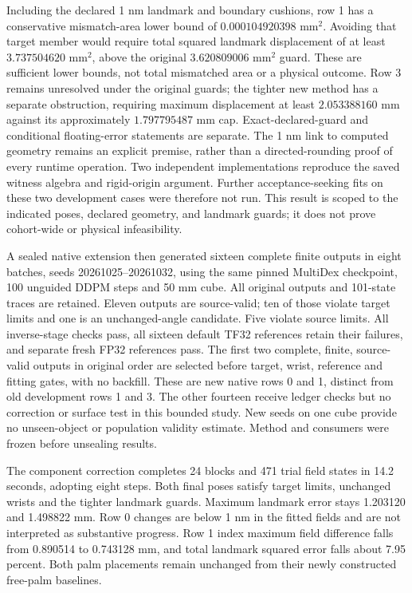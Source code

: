 \documentclass[10pt,letterpaper]{article}
\begin{document}
Including the declared 1 nm landmark and boundary cushions, row 1 has a
conservative mismatch-area lower bound of $0.000104920398$ mm$^2$. Avoiding
that target member would require total squared landmark displacement of at least
$3.737504620$ mm$^2$, above the original $3.620809006$ mm$^2$ guard.
These are sufficient lower bounds, not total mismatched area or a physical
outcome. Row 3 remains unresolved under the original guards; the tighter new
method has a separate obstruction, requiring maximum displacement at least
$2.053388160$ mm against its approximately $1.797795487$ mm cap. Exact-declared-guard and
conditional floating-error statements are separate. The 1 nm link to computed
geometry remains an explicit premise, rather than a directed-rounding proof
of every runtime operation. Two independent implementations reproduce the saved
witness algebra and rigid-origin argument. Further acceptance-seeking fits on
these two development cases were therefore not run. This result is scoped to
the indicated poses, declared geometry, and landmark guards; it does not prove
cohort-wide or physical infeasibility.

A sealed native extension then generated sixteen complete finite outputs in
eight batches, seeds 20261025--20261032, using the same pinned MultiDex
checkpoint, 100 unguided DDPM steps and 50 mm cube. All original outputs and
101-state traces are retained. Eleven outputs are source-valid; ten of those
violate target limits and one is an unchanged-angle candidate. Five violate
source limits. All inverse-stage checks pass, all sixteen default TF32
references retain their failures, and separate fresh FP32 references pass.
The first two complete, finite, source-valid outputs in original order are
selected before target, wrist, reference and fitting gates, with no backfill.
These are new native rows 0 and 1, distinct from old development rows 1 and 3.
The other fourteen receive ledger checks but no correction or surface test in
this bounded study. New seeds on one cube provide no unseen-object or population
validity estimate. Method and consumers were frozen before unsealing results.

The component correction completes 24 blocks and 471 trial field states in
14.2 seconds, adopting eight steps. Both final poses satisfy target limits,
unchanged wrists and the tighter landmark guards. Maximum landmark error stays
1.203120 and 1.498822 mm. Row 0 changes are below 1 nm in the fitted fields and
are not interpreted as substantive progress. Row 1 index maximum field
difference falls from 0.890514 to 0.743128 mm, and total landmark squared error
falls about 7.95 percent. Both palm placements remain unchanged from their
newly constructed free-palm baselines.
\end{document}
